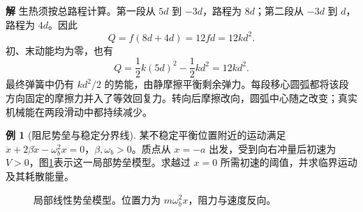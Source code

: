 \documentclass[11pt,openany,fontset=fandol]{ctexbook}
\theoremstyle{definition}\newtheorem{example}{例}[chapter]\newtheorem{exercise}{习题}[chapter]
\newcommand{\SolutionStart}{\par\medskip\ifdim\pagetotal>0pt\ifdim\dimexpr\pagegoal-\pagetotal\relax<3\baselineskip\newpage\fi\fi\noindent\textbf{解}\quad\ignorespaces}
\newenvironment{solution}{\SolutionStart}{\par\medskip}
\begin{document}
\begin{solution}
生热须按总路程计算。第一段从 $5d$ 到 $-3d$，路程为 $8d$；第二段从 $-3d$ 到 $d$，路程为 $4d$。因此
\[
Q=f(8d+4d)=12fd=12kd^2.
\]
初、末动能均为零，也有
\[
Q=\frac12k(5d)^2-\frac12kd^2=12kd^2.
\]
最终弹簧中仍有 $kd^2/2$ 的势能，由静摩擦平衡剩余弹力。每段移心圆弧都将该段方向固定的摩擦力并入了等效回复力。转向后摩擦改向，圆弧中心随之改变；真实机械能在两段滑动中都持续减少。
\end{solution}

\par\medskip\noindent\begin{minipage}{\textwidth}
\begin{example}[阻尼势垒与稳定分界线]\label{mp4:example:l4-e10}
某不稳定平衡位置附近的运动满足 $\ddot x+2\beta\dot x-\omega_b^2x=0$，$\beta,\omega_b>0$。质点从 $x=-a$ 出发，受到向右冲量后初速为 $V>0$，图\ref{mp4:fig:l4-e10-q}表示这一局部势垒模型。求越过 $x=0$ 所需初速的阈值，并求临界运动及其耗散能量。
\end{example}

\begin{figure}[H]\centering
{}
\caption{局部线性势垒模型。位置力为 $m\omega_b^2x$，阻力与速度反向。}\label{mp4:fig:l4-e10-q}
\end{figure}
\end{minipage}\par\medskip
\end{document}
